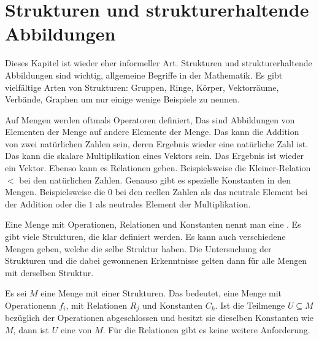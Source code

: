 
\chapter{Strukturen und strukturerhaltende Abbildungen}
\label{cha:Gdl-K07-Homomorphismen}

Dieses Kapitel ist wieder eher informeller Art. Strukturen und 
strukturerhaltende Abbildungen sind wichtig, allgemeine Begriffe in der 
Mathematik. Es gibt vielfältige Arten von Strukturen: Gruppen, Ringe, Körper,
Vektorräume, Verbände, Graphen um nur einige wenige Beispiele zu nennen.

\begin{unitAnmerkung}[Strukturen]
Auf Mengen werden oftmals Operatoren definiert, Das sind Abbildungen von 
Elementen der Menge auf andere Elemente der Menge. Das kann die Addition von 
zwei natürlichen Zahlen sein, deren Ergebnis wieder eine natürliche Zahl ist.
Das kann die skalare Multiplikation eines Vektors sein. Das Ergebnis ist wieder
ein Vektor. Ebenso kann es Relationen geben. Beispielsweise die 
Kleiner-Relation $<$ bei den natürlichen Zahlen. Genauso gibt es spezielle
Konstanten in den Mengen. Beispielsweise die $0$ bei den reellen Zahlen als
das neutrale Element bei der Addition oder die $1$ als neutrales Element der
Multiplikation.

Eine Menge mit Operationen, Relationen und Konstanten nennt man eine 
. Es gibt viele Strukturen, die klar definiert werden. Es 
kann auch verschiedene Mengen geben, welche die selbe Struktur haben. Die
Untersuchung der Strukturen und die dabei gewonnenen Erkenntnisse gelten dann 
für alle Mengen mit derselben Struktur. 
\end{unitAnmerkung}

\begin{unitAnmerkung}[Unterstrukturen]
Es sei $M$ eine Menge mit einer Strukturen. Das bedeutet, eine Menge mit 
Operationenn $f_i$, mit Relationen $R_j$ und Konstanten $C_k$. Ist die 
Teilmenge $U \subseteq M$ bezüglich der Operationen abgeschlossen und besitzt 
sie dieselben Konstanten wie $M$, dann ist $U$ eine  
von $M$. Für die Relationen gibt es keine weitere Anforderung. 
\end{unitAnmerkung}

